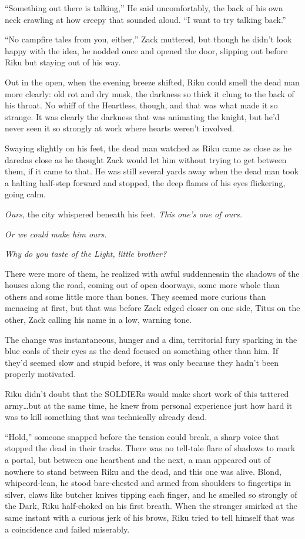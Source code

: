 ``Something out there is talking,'' He said uncomfortably, the back of his own neck crawling at how creepy that sounded aloud. ``I want to try talking back.''

``No campfire tales from you, either,'' Zack muttered, but though he didn't look happy with the idea, he nodded once and opened the door, slipping out before Riku but staying out of his way.

Out in the open, when the evening breeze shifted, Riku could smell the dead man more clearly: old rot and dry musk, the darkness so thick it clung to the back of his throat. No whiff of the Heartless, though, and that was what made it so strange. It was clearly the darkness that was animating the knight, but he'd never seen it so strongly at work where hearts weren't involved.

Swaying slightly on his feet, the dead man watched as Riku came as close as he dared\textemdash as close as he thought Zack would let him without trying to get between them, if it came to that. He was still several yards away when the dead man took a halting half-step forward and stopped, the deep flames of his eyes flickering, going calm.

\emph{Ours,} the city whispered beneath his feet. \emph{This one's one of ours.}

\emph{\textemdash Or we could make him ours.}

\emph{Why do you taste of the Light, little brother?}

There were more of them, he realized with awful suddenness\textemdash in the shadows of the houses along the road, coming out of open doorways, some more whole than others and some little more than bones. They seemed more curious than menacing at first, but that was before Zack edged closer on one side, Titus on the other, Zack calling his name in a low, warning tone.

The change was instantaneous, hunger and a dim, territorial fury sparking in the blue coals of their eyes as the dead focused on something other than him. If they'd seemed slow and stupid before, it was only because they hadn't been properly motivated.

Riku didn't doubt that the SOLDIERs would make short work of this tattered army\ldots but at the same time, he knew from personal experience just how hard it was to kill something that was technically already dead.

``Hold,'' someone snapped before the tension could break, a sharp voice that stopped the dead in their tracks. There was no tell-tale flare of shadows to mark a portal, but between one heartbeat and the next, a man appeared out of nowhere to stand between Riku and the dead, and this one was alive. Blond, whipcord-lean, he stood bare-chested and armed from shoulders to fingertips in silver, claws like butcher knives tipping each finger, and he smelled so strongly of the Dark, Riku half-choked on his first breath. When the stranger smirked at the same instant with a curious jerk of his brows, Riku tried to tell himself that was a coincidence and failed miserably.

